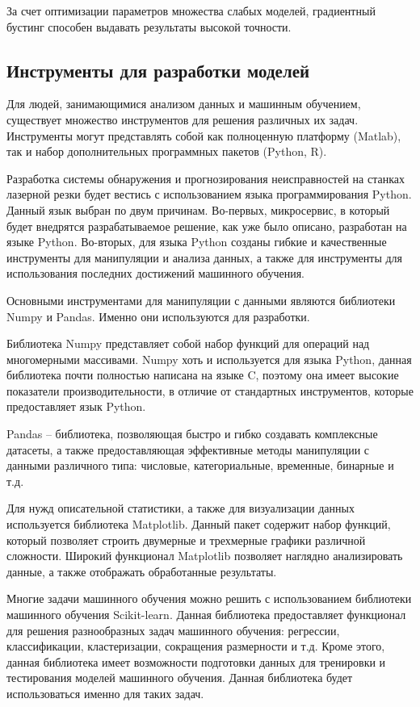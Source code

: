 За счет оптимизации параметров множества слабых моделей,
градиентный бустинг способен выдавать результаты высокой точности.


\subsection{Инструменты для разработки моделей}

Для людей, занимающимися
анализом данных и машинным обучением,
существует множество инструментов для решения
различных их задач.
Инструменты могут представлять собой
как полноценную платформу (Matlab),
так и набор дополнительных программных пакетов (Python, R).

Разработка системы обнаружения
и прогнозирования неисправностей на станках лазерной резки
будет вестись с использованием языка программирования Python.
Данный язык выбран по двум причинам.
Во-первых, микросервис, в который будет внедрятся разрабатываемое решение,
как уже было описано, разработан на языке Python.
Во-вторых, для языка Python созданы гибкие и качественные
инструменты для манипуляции и анализа данных,
а также для инструменты для использования
последних достижений машинного обучения.

Основными инструментами для манипуляции с данными
являются библиотеки Numpy и Pandas.
Именно они используются для разработки.

Библиотека Numpy представляет собой
набор функций для операций над многомерными массивами.
Numpy хоть и используется для языка Python,
данная библиотека почти полностью написана на языке C,
поэтому она имеет высокие показатели производительности,
в отличие от стандартных инструментов,
которые предоставляет язык Python.

Pandas -- библиотека, позволяющая
быстро и гибко создавать комплексные датасеты,
а также предоставляющая эффективные методы
манипуляции с данными различного типа:
числовые, категориальные, временные, бинарные и т.д.

Для нужд описательной статистики,
а также для визуализации данных
используется библиотека Matplotlib.
Данный пакет содержит набор функций,
который позволяет строить двумерные
и трехмерные графики различной сложности.
Широкий функционал Matplotlib позволяет
наглядно анализировать данные,
а также отображать обработанные результаты.

Многие задачи машинного обучения
можно решить с использованием библиотеки машинного обучения Scikit-learn.
Данная библиотека предоставляет функционал для решения разнообразных
задач машинного обучения: регрессии, классификации, кластеризации, сокращения размерности и т.д.
Кроме этого, данная библиотека имеет возможности подготовки данных
для тренировки и тестирования моделей машинного обучения.
Данная библиотека будет использоваться именно для таких задач.


